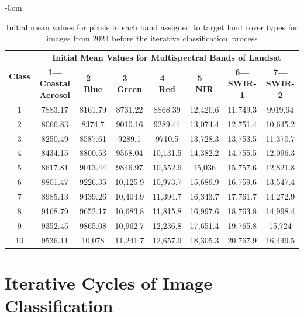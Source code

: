 \documentclass[jmse,article,accept,pdftex,oneauthor]{Definitions/mdpi}
\begin{document}
\begin{table}[H]
  \caption{Initial mean values for pixels in each band assigned to target land cover types for images from 2024 %
  	before the iterative classification~process   \label{tabA4} }

\begin{adjustwidth}{-\extralength}{0cm}
\setlength{\tabcolsep}{3.6mm}
   \begin{tabular}{cccccccc}
  \toprule
  \multirow{2}{*}{\textbf{Class}} & \multicolumn{7}{c}{\textbf{Initial Mean Values for Multispectral Bands of Landsat}} \\
     & \textbf{1---Coastal Aerosol} & \textbf{2---Blue} & \textbf{3---Green} & \textbf{4---Red} & \textbf{5---NIR} & \textbf{6---SWIR-1} & \textbf{7---SWIR-2} \\
    \midrule %
     1 & 7883.17 & 8161.79 & 8731.22 & 8868.39 & 12,420.6 & 11,749.3 & 9919.64 \\
     2 & 8066.83 & 8374.7 & 9010.16 & 9289.44 & 13,074.4 & 12,751.4 & 10,645.2 \\
     3 & 8250.49 & 8587.61 & 9289.1 & 9710.5 & 13,728.3 & 13,753.5 & 11,370.7 \\
     4 & 8434.15 & 8800.53 & 9568.04 & 10,131.5 & 14,382.2 & 14,755.5 & 12,096.3 \\
     5 & 8617.81 & 9013.44 & 9846.97 & 10,552.6 & 15,036 & 15,757.6 & 12,821.8 \\
     6 & 8801.47 & 9226.35 & 10,125.9 & 10,973.7 & 15,689.9 & 16,759.6 & 13,547.4 \\
     7 & 8985.13 & 9439.26 & 10,404.9 & 11,394.7 & 16,343.7 & 17,761.7 & 14,272.9 \\
     8 & 9168.79 & 9652.17 & 10,683.8 & 11,815.8 & 16,997.6 & 18,763.8 & 14,998.4 \\
     9 & 9352.45 & 9865.08 & 10,962.7 & 12,236.8 & 17,651.4 & 19,765.8 & 15,724 \\
    10 & 9536.11 & 10,078 & 11,241.7 & 12,657.9 & 18,305.3 & 20,767.9 & 16,449.5 \\
\bottomrule
\end{tabular}

\end{adjustwidth}

\end{table}


\section[\appendixname~\thesection]{Iterative Cycles of Image Classification}\label{AppB}
\end{document}
